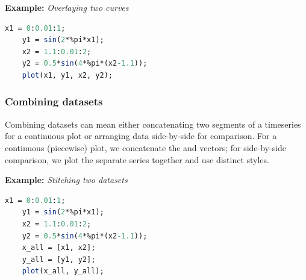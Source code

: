 		\textbf{Example:} \textit{Overlaying two curves}
		\begin{lstlisting}[language=Scilab]
	x1 = 0:0.01:1;
	y1 = sin(2*%pi*x1);
	x2 = 1.1:0.01:2;
	y2 = 0.5*sin(4*%pi*(x2-1.1));
	plot(x1, y1, x2, y2);
		\end{lstlisting}
	
	\subsubsection*{Combining datasets}
		Combining datasets can mean either concatenating two segments of a timeseries for a continuous plot or arranging data side-by-side for comparison. For a continuous (piecewise) plot, we concatenate the  and  vectors; for side-by-side comparison, we plot the separate series together and use distinct styles.
		
		\textbf{Example:} \textit{Stitching two datasets}
		\begin{lstlisting}[language=Scilab]
	x1 = 0:0.01:1;
	y1 = sin(2*%pi*x1);
	x2 = 1.1:0.01:2;
	y2 = 0.5*sin(4*%pi*(x2-1.1));
	x_all = [x1, x2];
	y_all = [y1, y2];
	plot(x_all, y_all);
		\end{lstlisting}